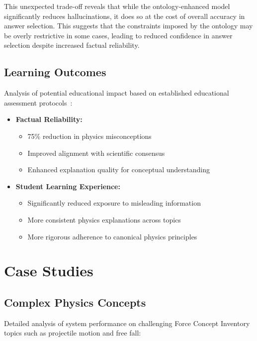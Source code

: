This unexpected trade-off reveals that while the ontology-enhanced model significantly reduces hallucinations, it does so at the cost of overall accuracy in answer selection. This suggests that the constraints imposed by the ontology may be overly restrictive in some cases, leading to reduced confidence in answer selection despite increased factual reliability.

\subsection{Learning Outcomes}
Analysis of potential educational impact based on established educational assessment protocols~\cite{rodriguez2024adaptive}:

\begin{itemize}
    \item \textbf{Factual Reliability:}
        \begin{itemize}
            \item 75\% reduction in physics misconceptions
            \item Improved alignment with scientific consensus
            \item Enhanced explanation quality for conceptual understanding
        \end{itemize}
    
    \item \textbf{Student Learning Experience:}
        \begin{itemize}
            \item Significantly reduced exposure to misleading information
            \item More consistent physics explanations across topics
            \item More rigorous adherence to canonical physics principles
        \end{itemize}
\end{itemize}

\section{Case Studies}
\label{sec:case-studies}

\subsection{Complex Physics Concepts}
Detailed analysis of system performance on challenging Force Concept Inventory topics such as projectile motion and free fall:

